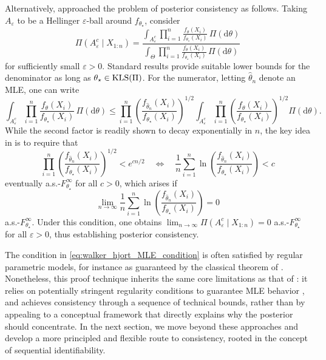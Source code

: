 \documentclass[11pt,twoside]{article}
\newcommand{\kls}{\textnormal{KLS}}
\begin{document}
Alternatively, \cite{walker2001} approached the problem of posterior consistency as follows. Taking $A_\varepsilon$ to be a Hellinger $\varepsilon$-ball around $f_{\theta_\star}$, consider
%
\begin{equation*}
    \Pi(A_\varepsilon^c \mid X_{1:n}) = \frac{\int_{A_\varepsilon^c}\prod_{i=1}^n\frac{f_\theta(X_i)}{f_{\theta_\star}(X_i)} \,\Pi(\mathrm d\theta)}{\int_{\Theta}\prod_{i=1}^n\frac{f_\theta(X_i)}{f_{\theta_\star}(X_i)} \,\Pi(\mathrm d\theta)}
\end{equation*}
%
for sufficiently small $\varepsilon > 0$. Standard results \citep[see, e.g.,][Lemma 4]{barron1999} provide suitable lower bounds for the denominator as long as $\theta_\star\in\kls(\Pi)$. For the numerator, letting $\hat\theta_n$ denote an MLE, one can write
%
\begin{equation*}
    \int_{A_\varepsilon^c}\prod_{i=1}^n\frac{f_\theta(X_i)}{f_{\theta_\star}(X_i)} \,\Pi(\mathrm d\theta) \leq \prod_{i=1}^n\left(\frac{f_{\hat\theta_n}(X_i)}{f_{\theta_\star}(X_i)}\right)^{1/2} \int_{A_\varepsilon^c}\prod_{i=1}^n\left(\frac{f_\theta(X_i)}{f_{\theta_\star}(X_i)}\right)^{1/2} \Pi(\mathrm d\theta).
\end{equation*}
%
While the second factor is readily shown to decay exponentially in $n$, the key idea in \cite{walker2001} is to require that
%
\begin{equation}\label{eq:walker_hjort_MLE_condition}
    \prod_{i=1}^n\left(\frac{f_{\hat\theta_n}(X_i)}{f_{\theta_\star}(X_i)}\right)^{1/2} < e^{cn/2} \quad \iff\quad \frac{1}{n}\sum_{i=1}^n \ln\left(\frac{f_{\hat\theta_n}(X_i)}{f_{\theta_\star}(X_i)}\right) < c
\end{equation}
%
eventually a.s.-$F_{\theta_\star}^\infty$ for all $c > 0$, which arises if
%
\begin{equation*}
\lim_{n\to\infty} \frac{1}{n}\sum_{i=1}^n  \ln\left(\frac{f_{\hat\theta_n}(X_i)}{f_{\theta_\star}(X_i)}\right) =  0
\end{equation*}
%
a.s.-$F_{\theta_\star}^\infty$. Under this condition, one obtains $\lim_{n \to \infty} \Pi(A_\varepsilon^c \mid X_{1:n}) = 0$ a.s.-$F_{\theta_\star}^\infty$ for all $\varepsilon > 0$, thus establishing posterior consistency.


The condition in \eqref{eq:walker_hjort_MLE_condition} is often satisfied by regular parametric models, for instance as guaranteed by the classical theorem of \cite{wilks1938large}. Nonetheless, this proof technique inherits the same core limitations as that of \cite{walker1969}: it relies on potentially stringent regularity conditions to guarantee MLE behavior \citep{kiefer1956consistency, vandegeer2000empirical, vandervaart2000asymptotic}, and achieves consistency through a sequence of technical bounds, rather than by appealing to a conceptual framework that directly explains why the posterior should concentrate. In the next section, we move beyond these approaches and develop a more principled and flexible route to consistency, rooted in the concept of sequential identifiability.
\end{document}

